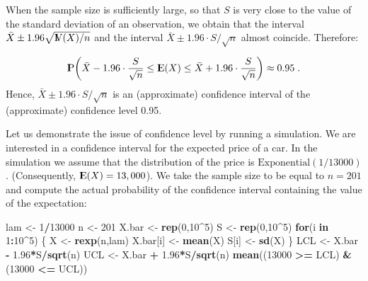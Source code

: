 \documentclass[]{krantz}
\makeatletter
\newenvironment{Shaded}{\begin{snugshade}}{\end{snugshade}}
\newcommand{\ControlFlowTok}[1]{\textcolor[rgb]{0.13,0.29,0.53}{\textbf{#1}}}
\newcommand{\DecValTok}[1]{\textcolor[rgb]{0.00,0.00,0.81}{#1}}
\newcommand{\FloatTok}[1]{\textcolor[rgb]{0.00,0.00,0.81}{#1}}
\newcommand{\KeywordTok}[1]{\textcolor[rgb]{0.13,0.29,0.53}{\textbf{#1}}}
\newcommand{\NormalTok}[1]{#1}
\newcommand{\OperatorTok}[1]{\textcolor[rgb]{0.81,0.36,0.00}{\textbf{#1}}}
\newcommand{\StringTok}[1]{\textcolor[rgb]{0.31,0.60,0.02}{#1}}
\newcommand{\Expec}{{\rm I\kern-.3em E}}
\newcommand{\Prob}{{\rm I\kern-.3em P}}
\newcommand{\Var}{{\rm I\kern-.3em V}}
\newenvironment{kframe}{%
\medskip{}
\setlength{\fboxsep}{.8em}
 \def\at@end@of@kframe{}%
 \ifinner\ifhmode%
  \def\at@end@of@kframe{\end{minipage}}%
  \begin{minipage}{\columnwidth}%
 \fi\fi%
 \def\FrameCommand##1{\hskip\@totalleftmargin \hskip-\fboxsep
 \colorbox{shadecolor}{##1}\hskip-\fboxsep
     \hskip-\linewidth \hskip-\@totalleftmargin \hskip\columnwidth}%
 \MakeFramed {\advance\hsize-\width
   \@totalleftmargin\z@ \linewidth\hsize
   \@setminipage}}%
 {\par\unskip\endMakeFramed%
 \at@end@of@kframe}
\renewenvironment{Shaded}{\begin{kframe}}{\end{kframe}}
\theoremstyle{definition}
\theoremstyle{definition}
\theoremstyle{definition}
\theoremstyle{remark}
\makeatother
\begin{document}
When the sample size is sufficiently large, so that \(S\) is very close to
the value of the standard deviation of an observation, we obtain that
the interval \(\bar X \pm 1.96 \sqrt{\Var(X)/n}\) and the interval
\(\bar X \pm 1.96 \cdot S/\sqrt{n}\) almost coincide. Therefore:

\[\Prob \bigg( \bar X -1.96 \cdot \frac{S}{\sqrt{n}} \leq  \Expec(X) \leq \bar X + 1.96 \cdot \frac{S}{\sqrt{n}}\bigg) \approx 0.95\;.\]
Hence, \(\bar X \pm 1.96 \cdot S/\sqrt{n}\) is an (approximate) confidence
interval of the (approximate) confidence level 0.95.

Let us demonstrate the issue of confidence level by running a
simulation. We are interested in a confidence interval for the expected
price of a car. In the simulation we assume that the distribution of the
price is \(\mathrm{Exponential}(1/13000)\). (Consequently,
\(\Expec(X) = 13,000\)). We take the sample size to be equal to \(n=201\)
and compute the actual probability of the confidence interval containing
the value of the expectation:

\begin{Shaded}
\begin{Highlighting}[]
\NormalTok{lam <-}\StringTok{ }\DecValTok{1}\OperatorTok{/}\DecValTok{13000}
\NormalTok{n <-}\StringTok{ }\DecValTok{201}
\NormalTok{X.bar <-}\StringTok{ }\KeywordTok{rep}\NormalTok{(}\DecValTok{0}\NormalTok{,}\DecValTok{10}\OperatorTok{^}\DecValTok{5}\NormalTok{)}
\NormalTok{S <-}\StringTok{ }\KeywordTok{rep}\NormalTok{(}\DecValTok{0}\NormalTok{,}\DecValTok{10}\OperatorTok{^}\DecValTok{5}\NormalTok{)}
\ControlFlowTok{for}\NormalTok{(i }\ControlFlowTok{in} \DecValTok{1}\OperatorTok{:}\DecValTok{10}\OperatorTok{^}\DecValTok{5}\NormalTok{) \{}
\NormalTok{  X <-}\StringTok{ }\KeywordTok{rexp}\NormalTok{(n,lam)}
\NormalTok{  X.bar[i] <-}\StringTok{ }\KeywordTok{mean}\NormalTok{(X)}
\NormalTok{  S[i] <-}\StringTok{ }\KeywordTok{sd}\NormalTok{(X)}
\NormalTok{\}}
\NormalTok{LCL <-}\StringTok{ }\NormalTok{X.bar }\OperatorTok{-}\StringTok{ }\FloatTok{1.96}\OperatorTok{*}\NormalTok{S}\OperatorTok{/}\KeywordTok{sqrt}\NormalTok{(n)}
\NormalTok{UCL <-}\StringTok{ }\NormalTok{X.bar }\OperatorTok{+}\StringTok{ }\FloatTok{1.96}\OperatorTok{*}\NormalTok{S}\OperatorTok{/}\KeywordTok{sqrt}\NormalTok{(n)}
\KeywordTok{mean}\NormalTok{((}\DecValTok{13000} \OperatorTok{>=}\StringTok{ }\NormalTok{LCL) }\OperatorTok{&}\StringTok{ }\NormalTok{(}\DecValTok{13000} \OperatorTok{<=}\StringTok{ }\NormalTok{UCL))}
\end{Highlighting}
\end{Shaded}
\end{document}
